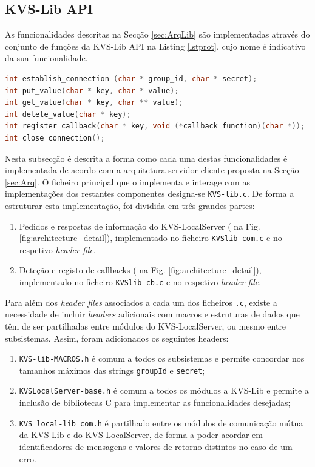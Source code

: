 \subsection{KVS-Lib API}
As funcionalidades descritas na Secção \ref{sec:ArqLib} são implementadas através do conjunto de funções da KVS-Lib API na Listing \ref{lstprot}, cujo nome é indicativo da sua funcionalidade.
\begin{lstlisting}[language=C,label={lstprot},caption=Protótipos da KVS-Lib API.]
int establish_connection (char * group_id, char * secret);
int put_value(char * key, char * value);
int get_value(char * key, char ** value);
int delete_value(char * key);
int register_callback(char * key, void (*callback_function)(char *));
int close_connection();
\end{lstlisting}

Nesta subsecção é descrita a forma como cada uma destas funcionalidades é implementada de acordo com a arquitetura servidor-cliente proposta na Secção \ref{sec:Arq}. O ficheiro principal que o implementa e interage com as implementações dos restantes componentes designa-se \texttt{KVS-lib.c}. De forma a estruturar esta implementação, foi dividida em três grandes partes: 
\begin{enumerate}[noitemsep]
    \item  Pedidos e respostas de informação do KVS-LocalServer ( na Fig. \ref{fig:architecture_detail}), implementado no ficheiro \texttt{KVSlib-com.c} e no respetivo \textit{header file}.
    \item Deteção e registo de callbacks ( na Fig. \ref{fig:architecture_detail}), implementado no ficheiro \texttt{KVSlib-cb.c} e no respetivo \textit{header file}.
\end{enumerate}
Para além dos \textit{header files} associados a cada um dos ficheiros \texttt{.c}, existe a necessidade de incluir \textit{headers} adicionais com macros e estruturas de dados que têm de ser partilhadas entre módulos do KVS-LocalServer, ou mesmo entre subsistemas. Assim, foram adicionados os seguintes headers:
\begin{enumerate}[noitemsep]
 \item \texttt{KVS-lib-MACROS.h} é comum a todos os subsistemas e permite concordar nos tamanhos máximos das strings \texttt{groupId} e \texttt{secret};
\item \texttt{KVSLocalServer-base.h} é comum a todos os módulos a KVS-Lib e permite a inclusão de bibliotecas C para implementar as funcionalidades desejadas;
\item \texttt{KVS\_local-lib\_com.h} é partilhado entre os módulos de comunicação mútua da KVS-Lib e do KVS-LocalServer, de forma a poder acordar em identificadores de mensagens e valores de retorno distintos no caso de um erro.
\end{enumerate}


